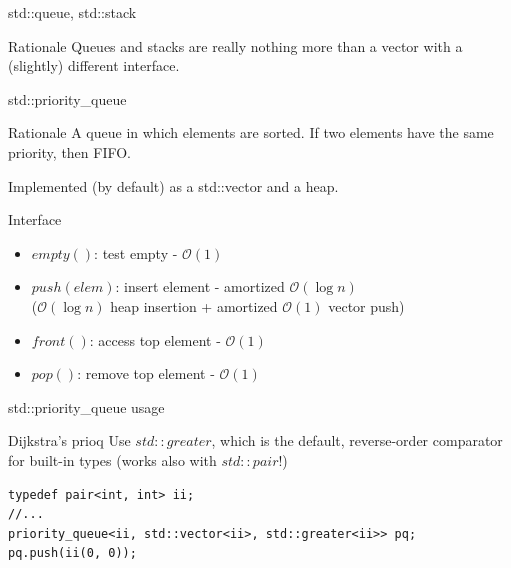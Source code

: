 \documentclass[compress]{beamer}
\begin{document}
\begin{frame}{std::queue, std::stack}
    \begin{block}{Rationale}
        Queues and stacks are really nothing more than a vector with a (slightly) different interface.
    \end{block}
\end{frame}

\begin{frame}{std::priority\_queue}
    \begin{block}{Rationale}
        A queue in which elements are sorted. If two elements have the same priority, then FIFO.

        Implemented (by default) as a std::vector and a heap.
    \end{block}\pause

    \begin{block}{Interface}
        \begin{itemize}
            \item $empty()$: test empty - $\mathcal{O}(1)$
            \item $push(elem)$: insert element - amortized $\mathcal{O}(\log n)$ \\ ($\mathcal{O}(\log n)$ heap insertion + amortized $\mathcal{O}(1)$ vector push)
            \item $front()$: access top element - $\mathcal{O}(1)$
            \item $pop()$: remove top element - $\mathcal{O}(1)$
        \end{itemize}
    \end{block}
\end{frame}

\begin{frame}[fragile]{std::priority\_queue usage}
    \begin{block}{Dijkstra's prioq}
        Use $std::greater$, which is the default, reverse-order comparator for built-in types (works also with $std::pair$!)
        \begin{lstlisting}
typedef pair<int, int> ii;
//...
priority_queue<ii, std::vector<ii>, std::greater<ii>> pq;
pq.push(ii(0, 0));
\end{lstlisting}
    \end{block}
\end{frame}
\end{document}
